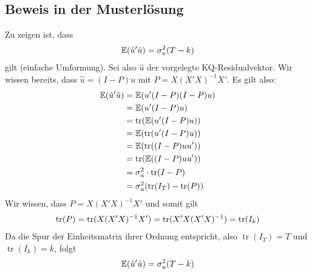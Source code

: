 \documentclass{article}
\newcommand{\E}{\mathbb{E}}
\DeclareMathOperator{\tr}{tr}
\begin{document}
	\subsection{Beweis in der Musterlösung}
	Zu zeigen ist, dass
	\begin{align}
		\E(\hat{u}'\hat{u}) = \sigma_u^2(T-k) \notag
	\end{align}
	gilt (einfache Umformung). Sei also $\hat{u}$ der vorgelegte KQ-Residualvektor. Wir wissen bereits, dass $\hat{u}=(I-P)u$ mit $P=X(X'X)^{-1}X'$. Es gilt also:
	\begin{align}
		\E(\hat{u}'\hat{u}) &= \E(u'(I-P)(I-P)u) \notag \\
		&= \E(u'(I-P)u) \notag \\
		&= \tr(\E(u'(I-P)u)) \notag \\
		&= \E(\tr(u'(I-P)u)) \notag \\
		&= \E(\tr((I-P)uu')) \notag \\
		&= \tr(\E((I-P)uu')) \notag \\
		&= \sigma_u^2\cdot\tr(I-P) \notag \\
		&= \sigma_u^2(\tr(I_T) - \tr(P)) \notag
	\end{align}
	Wir wissen, dass $P=X(X'X)^{-1}X'$ und somit gilt
	\begin{align}
		\tr(P) = \tr(X(X'X)^{-1}X') = \tr(X'X(X'X)^{-1}) = \tr(I_k) \notag
	\end{align}
	Da die Spur der Einheitsmatrix ihrer Ordnung entspricht, also $\tr(I_T)=T$ und $\tr(I_k)=k$, folgt
	\begin{align}
		\E(\hat{u}'\hat{u}) = \sigma_u^2(T-k) \notag
	\end{align}
	
\end{document}
